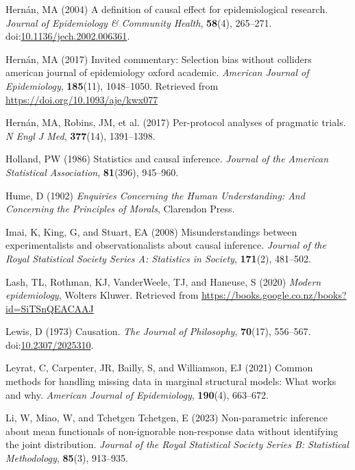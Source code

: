 \documentclass[
  single column]{article}
\newlength{\cslhangindent}
\newenvironment{CSLReferences}[2] %
 {\begin{list}{}{%
  \setlength{\itemindent}{0pt}
  \setlength{\leftmargin}{0pt}
  \setlength{\parsep}{0pt}
  \ifodd #1
   \setlength{\leftmargin}{\cslhangindent}
   \setlength{\itemindent}{-1\cslhangindent}
  \fi
  \setlength{\itemsep}{#2\baselineskip}}}
 {\end{list}}
\begin{document}
\begin{CSLReferences}{1}{0}
Hernán, MA (2004) A definition of causal effect for epidemiological
research. \emph{Journal of Epidemiology \& Community Health},
\textbf{58}(4), 265--271.
doi:\href{https://doi.org/10.1136/jech.2002.006361}{10.1136/jech.2002.006361}.

Hernán, MA (2017) Invited commentary: Selection bias without colliders
\textbar{} american journal of epidemiology \textbar{} oxford academic.
\emph{American Journal of Epidemiology}, \textbf{185}(11), 1048--1050.
Retrieved from \url{https://doi.org/10.1093/aje/kwx077}

Hernán, MA, Robins, JM, et al. (2017) Per-protocol analyses of pragmatic
trials. \emph{N Engl J Med}, \textbf{377}(14), 1391--1398.

Holland, PW (1986) Statistics and causal inference. \emph{Journal of the
American Statistical Association}, \textbf{81}(396), 945--960.

Hume, D (1902) \emph{Enquiries Concerning the Human Understanding: And
Concerning the Principles of Morals}, Clarendon Press.

Imai, K, King, G, and Stuart, EA (2008) Misunderstandings between
experimentalists and observationalists about causal inference.
\emph{Journal of the Royal Statistical Society Series A: Statistics in
Society}, \textbf{171}(2), 481--502.

Lash, TL, Rothman, KJ, VanderWeele, TJ, and Haneuse, S (2020)
\emph{Modern epidemiology}, Wolters Kluwer. Retrieved from
\url{https://books.google.co.nz/books?id=SiTSnQEACAAJ}

Lewis, D (1973) Causation. \emph{The Journal of Philosophy},
\textbf{70}(17), 556--567.
doi:\href{https://doi.org/10.2307/2025310}{10.2307/2025310}.

Leyrat, C, Carpenter, JR, Bailly, S, and Williamson, EJ (2021) Common
methods for handling missing data in marginal structural models: What
works and why. \emph{American Journal of Epidemiology}, \textbf{190}(4),
663--672.

Li, W, Miao, W, and Tchetgen Tchetgen, E (2023) Non-parametric inference
about mean functionals of non-ignorable non-response data without
identifying the joint distribution. \emph{Journal of the Royal
Statistical Society Series B: Statistical Methodology}, \textbf{85}(3),
913--935.


\end{CSLReferences}
\end{document}
